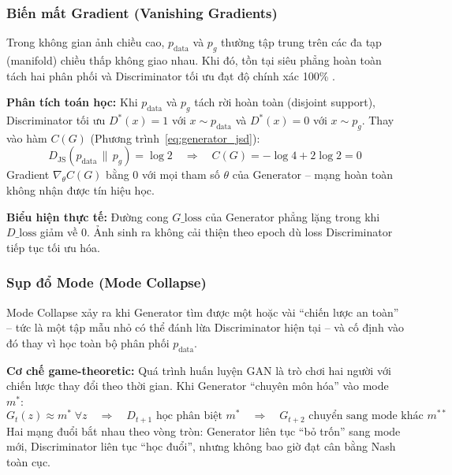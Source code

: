 \subsubsection{Biến mất Gradient (Vanishing Gradients)}

Trong không gian ảnh chiều cao, $p_{\text{data}}$ và $p_g$ thường tập trung trên các đa tạp (manifold) chiều thấp không giao nhau. Khi đó, tồn tại siêu phẳng hoàn toàn tách hai phân phối và Discriminator tối ưu đạt độ chính xác 100\% \cite{Arjovsky2017}.

\textbf{Phân tích toán học:} Khi $p_{\text{data}}$ và $p_g$ tách rời hoàn toàn (disjoint support), Discriminator tối ưu $D^*(x) = 1$ với $x \sim p_{\text{data}}$ và $D^*(x) = 0$ với $x \sim p_g$. Thay vào hàm $C(G)$ (Phương trình~\ref{eq:generator_jsd}):
\begin{equation}
\label{eq:jsd_disjoint}
D_{\text{JS}}(p_{\text{data}} \,\|\, p_g) = \log 2 \quad \Rightarrow \quad C(G) = -\log 4 + 2\log 2 = 0
\end{equation}
Gradient $\nabla_\theta C(G)$ bằng 0 với mọi tham số $\theta$ của Generator -- mạng hoàn toàn không nhận được tín hiệu học.

\textbf{Biểu hiện thực tế:} Đường cong $G\_\text{loss}$ của Generator phẳng lặng trong khi $D\_\text{loss}$ giảm về 0. Ảnh sinh ra không cải thiện theo epoch dù loss Discriminator tiếp tục tối ưu hóa.

\subsubsection{Sụp đổ Mode (Mode Collapse)}
\label{subsubsec:mode_collapse}

Mode Collapse xảy ra khi Generator tìm được một hoặc vài ``chiến lược an toàn'' -- tức là một tập mẫu nhỏ có thể đánh lừa Discriminator hiện tại -- và cố định vào đó thay vì học toàn bộ phân phối $p_{\text{data}}$.

\textbf{Cơ chế game-theoretic:} Quá trình huấn luyện GAN là trò chơi hai người với chiến lược thay đổi theo thời gian. Khi Generator ``chuyên môn hóa'' vào mode $m^*$:
\begin{equation}
\label{eq:mode_collapse_dynamics}
G_t(z) \approx m^* \;\forall z \quad \Rightarrow \quad D_{t+1} \text{ học phân biệt } m^* \quad \Rightarrow \quad G_{t+2} \text{ chuyển sang mode khác } m^{**}
\end{equation}
Hai mạng đuổi bắt nhau theo vòng tròn: Generator liên tục ``bỏ trốn'' sang mode mới, Discriminator liên tục ``học đuổi'', nhưng không bao giờ đạt cân bằng Nash toàn cục.

